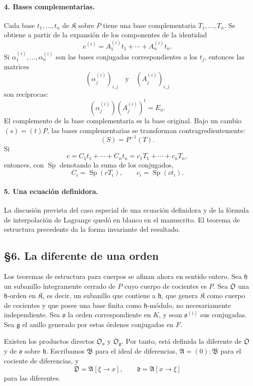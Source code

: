 \documentclass[11pt]{article}
\begin{document}
\paragraph{4. Bases complementarias.}
Cada base $t_1,\ldots,t_n$ de $\mathfrak K$ sobre $P$ tiene una base complementaria $T_1,\ldots,T_n$. Se obtiene a partir de la expansión de los componentes de la identidad
\[
        e^{(i)}=A_1^{(i)}t_1+
        \cdots+A_n^{(i)}t_n.
\]
Si $\alpha_1^{(i)},\ldots,\alpha_n^{(i)}$ son las bases conjugadas correspondientes a los $t_j$, entonces las matrices
\[
        (\alpha_j^{(i)})_{i,j}
        \quad\text{y}\quad
        (A_j^{(i)})_{i,j}
\]
son recíprocas:
\[
        (\alpha_j^{(i)})(A_j^{(i)})^{t}=E_n.
\]
El complemento de la base complementaria es la base original. Bajo un cambio $(s)=(t)P$, las bases complementarias se transforman contragredientemente:
\[
        (S)=P^{-1}(T).
\]
Si
\[
        c=C_1t_1+
        \cdots+C_nt_n
        =c_1T_1+
        \cdots+c_nT_n,
\]
entonces, con $\operatorname{Sp}$ denotando la suma de los conjugados,
\[
        C_i=\operatorname{Sp}(cT_i),
        \qquad
        c_i=\operatorname{Sp}(ct_i).
\]

\paragraph{5. Una ecuación definidora.}
La discusión prevista del caso especial de una ecuación definidora y de la fórmula de interpolación de Lagrange quedó en blanco en el manuscrito. El teorema de estructura precedente da la forma invariante del resultado.

\subsection*{§6. La diferente de una orden}

Los teoremas de estructura para cuerpos se afinan ahora en sentido entero. Sea $\mathfrak h$ un subanillo íntegramente cerrado de $P$ cuyo cuerpo de cocientes es $P$. Sea $\mathfrak O$ una $\mathfrak h$-orden en $\mathfrak K$, es decir, un subanillo que contiene a $\mathfrak h$, que genera $\mathfrak K$ como cuerpo de cocientes y que posee una base finita como $\mathfrak h$-módulo, no necesariamente independiente. Sea $\mathfrak o$ la orden correspondiente en $K$, y sean $\mathfrak o^{(i)}$ sus conjugadas. Sea $\mathfrak g$ el anillo generado por estas órdenes conjugadas en $F$.

Existen los productos directos $\mathfrak O_{\mathfrak o}$ y $\mathfrak O_{\mathfrak g}$. Por tanto, está definida la diferente de $\mathfrak O$ y de $\mathfrak o$ sobre $\mathfrak h$. Escribamos $\mathfrak B$ para el ideal de diferencias, $\mathfrak A=(0):\mathfrak B$ para el cociente de diferencias, y
\[
        \mathfrak D=\mathfrak A[\xi\to x],
        \qquad
        \mathfrak d=\mathfrak A[x\to\xi]
\]
para las diferentes.
\end{document}
